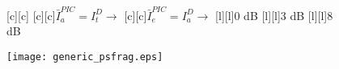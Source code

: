 \documentclass{article}
\begin{document}
\begin{figure}[htb]
  \begin{center}

        [c][c]{}
        [c][c]{$\bar{I}_{a}^{PIC}=I_{t}^D \rightarrow$}
        [c][c]{$\bar{I}_{e}^{PIC}=I_{a}^D \rightarrow$}
        [l][l]{0 dB}
        [l][l]{3 dB}
	\psfrag{******}[l][l]{8 dB}
	        

    \texttt{[image: generic\_psfrag.eps]}
    \end{center}
\end{figure}
\end{document}
